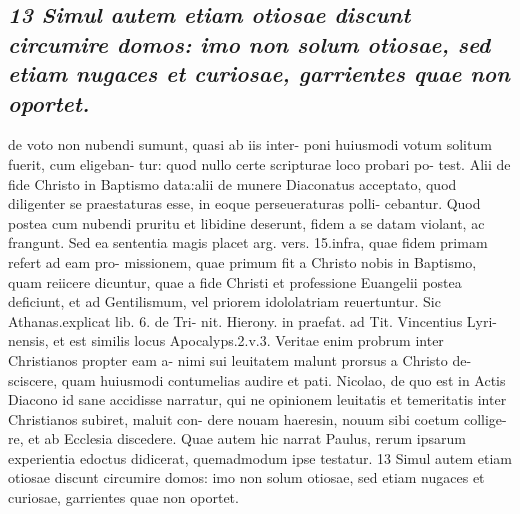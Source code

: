 \documentclass{article}
\begin{document}
\begin{pages}
\subsection*{\textit{13 Simul autem etiam otiosae discunt circumire domos: imo non solum otiosae, sed etiam nugaces et curiosae, garrientes quae non oportet.}}de voto non nubendi sumunt, quasi ab iis inter- poni huiusmodi votum solitum fuerit, cum eligeban- tur: quod nullo certe scripturae loco probari po- test. Alii de fide Christo in Baptismo data:alii de munere Diaconatus acceptato, quod diligenter se praestaturas esse, in eoque perseueraturas polli- cebantur. Quod postea cum nubendi pruritu et libidine deserunt, fidem a se datam violant, ac frangunt. Sed ea sententia magis placet arg. vers. 15.infra, quae fidem primam refert ad eam pro- missionem, quae primum fit a Christo nobis in Baptismo, quam reiicere dicuntur, quae a fide Christi et professione Euangelii postea deficiunt, et ad Gentilismum, vel priorem idololatriam reuertuntur. Sic Athanas.explicat lib. 6. de Tri- nit. Hierony. in praefat. ad Tit. Vincentius Lyri- nensis, et est similis locus Apocalyps.2.v.3. Veritae enim probrum inter Christianos propter eam a- nimi sui leuitatem malunt prorsus a Christo de- sciscere, quam huiusmodi contumelias audire et pati. Nicolao, de quo est in Actis Diacono id sane accidisse narratur, qui ne opinionem leuitatis et temeritatis inter Christianos subiret, maluit con- dere nouam haeresin, nouum sibi coetum collige- re, et ab Ecclesia discedere. Quae autem hic narrat Paulus, rerum ipsarum experientia edoctus didicerat, quemadmodum ipse testatur. 13 Simul autem etiam otiosae discunt circumire domos: imo non solum otiosae, sed etiam nugaces et curiosae, garrientes quae non oportet.  \pend

\end{pages}
\end{document}
